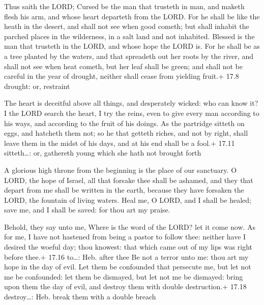  Thus saith the LORD; Cursed be the man that trusteth in
man, and maketh flesh his arm, and whose heart departeth from the LORD.
 For he shall be like the heath in the desert, and shall not
see when good cometh; but shall inhabit the parched places in the
wilderness, in a salt land and not inhabited.  Blessed is
the man that trusteth in the LORD, and whose hope the LORD is.
 For he shall be as a tree planted by the waters, and that
spreadeth out her roots by the river, and shall not see when heat
cometh, but her leaf shall be green; and shall not be careful in the
year of drought, neither shall cease from yielding fruit.+ 17.8 drought:
or, restraint

 The heart is deceitful above all things, and desperately
wicked: who can know it?  I the LORD search the heart, I
try the reins, even to give every man according to his ways, and
according to the fruit of his doings.  As the partridge
sitteth on eggs, and hatcheth them not; so he that getteth riches, and
not by right, shall leave them in the midst of his days, and at his end
shall be a fool.+ 17.11 sitteth\ldots: or, gathereth young which she
hath not brought forth

 A glorious high throne from the beginning is the place
of our sanctuary.  O LORD, the hope of Israel, all that
forsake thee shall be ashamed, and they that depart from me shall be
written in the earth, because they have forsaken the LORD, the fountain
of living waters.  Heal me, O LORD, and I shall be healed;
save me, and I shall be saved: for thou art my praise.

 Behold, they say unto me, Where is the word of the LORD?
let it come now.  As for me, I have not hastened from being
a pastor to follow thee: neither have I desired the woeful day; thou
knowest: that which came out of my lips was right before thee.+ 17.16
to\ldots: Heb. after thee  Be not a terror unto me: thou
art my hope in the day of evil.  Let them be confounded
that persecute me, but let not me be confounded: let them be dismayed,
but let not me be dismayed: bring upon them the day of evil, and destroy
them with double destruction.+ 17.18 destroy\ldots: Heb. break them with
a double breach

